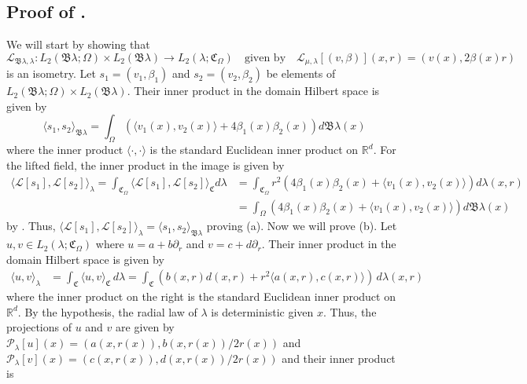 \documentclass[11pt]{article}
\begin{document}
\subsection{Proof of .} \label{sec: proof of isometry}
We will start by showing that 
\[\mathcal{L}_{\mathfrak{B}\lambda, \lambda}: L_2(\mathfrak{B}\lambda; \Omega) \times L_2(\mathfrak{B}\lambda) \rightarrow L_2(\lambda; \mathfrak{C}_\Omega) \quad \text{given by} \quad \mathcal{L}_{\mu, \lambda}[(v, \beta)](x,r) = (v(x), 2\beta(x)r)\]
is an isometry. Let $s_1 = (v_1, \beta_1)$ and $s_2 = (v_2, \beta_2)$ be elements of $L_2(\mathfrak{B}\lambda; \Omega) \times L_2(\mathfrak{B}\lambda)$. Their inner product in the domain Hilbert space is given by 
\[\langle s_1, s_2\rangle_{\mathfrak{B}\lambda} = \int_{\Omega}\left( \langle v_1(x), v_2(x)\rangle + 4\beta_1(x)\beta_2(x)\right)d\mathfrak{B}\lambda(x) \]
where the inner product $\langle\cdot, \cdot\rangle$ is the standard Euclidean inner product on $\mathbb{R}^d$. For the lifted field, the inner product in the image is given by
\begin{align*}\langle \mathcal{L}[s_1], \mathcal{L}[s_2]\rangle_{\lambda} = \int_{\mathfrak{C}_\Omega} \langle \mathcal{L}[s_1], \mathcal{L}[s_2]\rangle_{\mathfrak{C}} d\lambda &= \int_{\mathfrak{C}_\Omega}r^2\left(4\beta_1(x)\beta_2(x) + \langle v_1(x), v_2(x) \rangle\right)d\lambda(x,r) \\
&= \int_\Omega \left(4\beta_1(x)\beta_2(x) + \langle v_1(x), v_2(x) \rangle\right)d\mathfrak{B}\lambda(x)
\end{align*}
by . Thus, $\langle \mathcal{L}[s_1], \mathcal{L}[s_2]\rangle_{\lambda} = \langle s_1, s_2\rangle_{\mathfrak{B}\lambda}$ proving (a). Now we will prove (b). Let $u, v \in L_2(\lambda; \mathfrak{C}_\Omega)$ where $u = a + b\partial_r$ and $v = c + d\partial_r$. Their inner product in the domain Hilbert space is given by
\begin{align*}
    \langle u, v\rangle_{\lambda} &= \int_{\mathfrak{C}} \langle u, v \rangle_{\mathfrak{C}}\,d\lambda = \int_{\mathfrak{C}} \left(b(x,r)d(x,r) + r^2\langle a(x,r), c(x,r)\rangle \right)\,d\lambda(x,r)
\end{align*}
where the inner product on the right is the standard Euclidean inner product on $\mathbb{R}^d$. By the hypothesis, the radial law of $\lambda$ is deterministic given $x$. Thus, the projections of $u$ and $v$ are given by $\mathcal{P}_{\lambda}[u](x) = (a(x,r(x)), b(x,r(x))/2r(x))$ and $\mathcal{P}_{\lambda}[v](x) = (c(x,r(x)), d(x,r(x))/2r(x))$ and their inner product is
\end{document}
